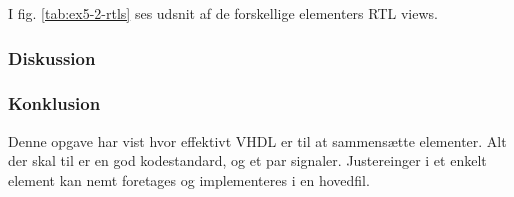 {I fig. \ref{tab:ex5-2-rtls} ses udsnit af de forskellige elementers RTL views.
















\subsubsection{Diskussion}
\subsubsection{Konklusion}
}

Denne opgave har vist hvor effektivt VHDL er til at sammensætte elementer. Alt der skal til er en god kodestandard, og et par signaler. Justereinger i et enkelt element kan nemt foretages og implementeres i en hovedfil.
